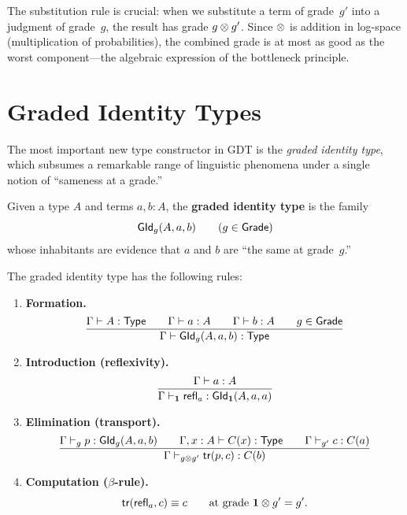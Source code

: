 The substitution rule is crucial: when we substitute a term of
grade~$g'$ into a judgment of grade~$g$, the result has grade
$g \otimes g'$.  Since $\otimes$ is addition in log-space (multiplication
of probabilities), the combined grade is at most as good as the
worst component---the algebraic expression of the bottleneck
principle.

\section{Graded Identity Types}
\label{sec:gid}

The most important new type constructor in GDT is the
\emph{graded identity type}, which subsumes a remarkable range of
linguistic phenomena under a single notion of ``sameness at a
grade.''

\begin{definition}
\label{def:gid}
Given a type $A$ and terms $a, b : A$, the \textbf{graded identity
type} is the family
\[
  \mathsf{GId}_g(A, a, b) \qquad (g \in \mathsf{Grade})
\]
whose inhabitants are evidence that $a$ and $b$ are ``the same at
grade~$g$.''
\end{definition}

The graded identity type has the following rules:

\begin{definition}
\label{def:gid-rules}
\leavevmode
\begin{enumerate}[label=(\alph*)]
\item \textbf{Formation.}
  \[
    \frac{\Gamma \vdash A : \mathsf{Type} \qquad
      \Gamma \vdash a : A \qquad
      \Gamma \vdash b : A \qquad
      g \in \mathsf{Grade}}{
      \Gamma \vdash \mathsf{GId}_g(A, a, b) : \mathsf{Type}}
  \]

\item \textbf{Introduction (reflexivity).}
  \[
    \frac{\Gamma \vdash a : A}{
      \Gamma \vdash_{\mathbf{1}} \mathsf{refl}_a : \mathsf{GId}_{\mathbf{1}}(A, a, a)}
  \]

\item \textbf{Elimination (transport).}
  \[
    \frac{\Gamma \vdash_g p : \mathsf{GId}_g(A, a, b) \qquad
      \Gamma, x : A \vdash C(x) : \mathsf{Type} \qquad
      \Gamma \vdash_{g'} c : C(a)}{
      \Gamma \vdash_{g \otimes g'} \mathsf{tr}(p, c) : C(b)}
  \]

\item \textbf{Computation ($\beta$-rule).}
  \[
    \mathsf{tr}(\mathsf{refl}_a, c) \equiv c
    \qquad\text{at grade } \mathbf{1} \otimes g' = g'.
  \]
\end{enumerate}
\end{definition}

